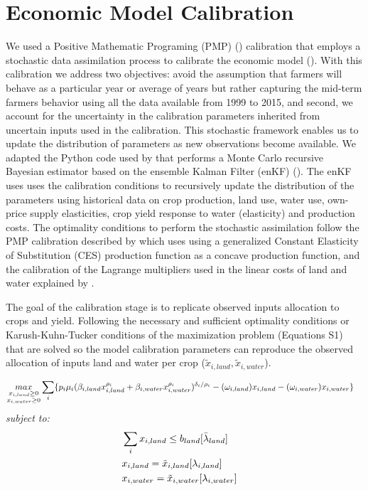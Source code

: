\documentclass[11pt,a4paper]{article}
\begin{document}
\section{Economic Model Calibration}

We used a Positive Mathematic Programing (PMP) (\cite{howitt_calibration_1995}) calibration that employs a stochastic data assimilation process to calibrate the economic model (\cite{maneta_satellite-driven_2020}).  With this calibration we address two objectives: avoid the assumption that farmers will behave as a particular year or average of years but rather capturing the mid-term farmers behavior using all the data available from 1999 to 2015, and second, we account for the uncertainty in the calibration parameters inherited from uncertain inputs used in the calibration. This stochastic framework enables us to update the distribution of parameters as new observations become available. We adapted the Python code used by \textcite{maneta_satellite-driven_2020} that performs a Monte Carlo recursive Bayesian estimator based on the ensemble Kalman Filter (enKF) (\cite{evensen_sequential_1994}). The enKF uses uses the calibration conditions to recursively update the distribution of the parameters using historical data on crop production, land use, water use, own-price supply elasticities, crop yield response to water (elasticity) and production costs. The optimality conditions to perform the stochastic assimilation follow the PMP calibration described by \textcite{merel_fully_2011} which uses using a generalized Constant Elasticity of Substitution (CES) production function as a concave production function, and the calibration of the Lagrange multipliers used in the linear costs of land and water explained by  \textcite{garnache_calibration_2017}. 

The goal of the calibration stage is to replicate observed inputs allocation to crops and yield. Following the necessary and sufficient optimality conditions or Karush-Kuhn-Tucker conditions of the maximization problem (Equations S1) that are solved so the model calibration parameters can reproduce the observed allocation of inputs land and water per crop ($\tilde{x}_{i,land},\tilde{x}_{i,water}$).

\begin{align}
&\underset{{\substack{x_{i,land}\geq0\\x_{i,water}\geq0}}}{max} \sum_{i} \{p_{i}\mu_{i}(\beta_{i,land} x^{\rho_i}_{i,land}+\beta_{i,water} x^{\rho_i}_{i,water})^{\delta_{i}/\rho_i} - (\omega_{i,land}) x_{i,land}-(\omega_{i,water})x_{i,water}\}&\notag
\end{align}
\textit{subject to:}
\begin{align}
&\sum_{i} x_{i,land} \leq b_{land}[\bar{\lambda}_{land}]&\\
&x_{i,land} = \tilde{x}_{i,land}[\lambda_{i,land}]\notag\\
&x_{i,water} = \tilde{x}_{i,water}[\lambda_{i,water}]\notag
\end{align}
\end{document}
